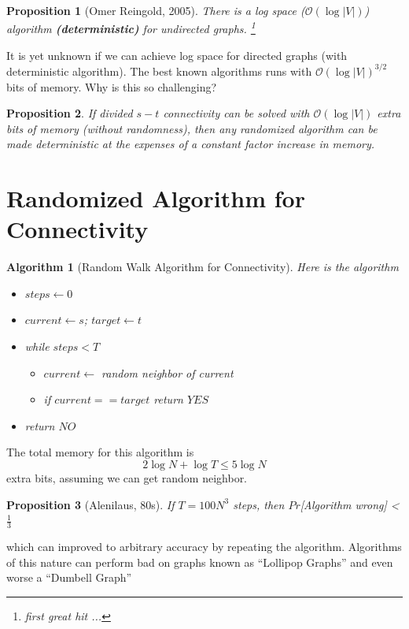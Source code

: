 \documentclass[11pt, letter]{book}
\newtheorem{algorithm}{Algorithm}[chapter]
\newtheorem{proposition}{Proposition}[chapter]
\begin{document}
\begin{proposition}[Omer Reingold, 2005]
	There is a log space ($\mathcal O ( \log | V | )$) algorithm \textbf{(deterministic)} for undirected graphs. \footnote{first great hit ...}
\end{proposition}

It is yet unknown if we can achieve log space for directed graphs (with deterministic algorithm). The best known algorithms runs with $\mathcal O (\log |V| ) ^{3/2}$ bits of memory. Why is this so challenging? 

\begin{proposition}
	If divided $s-t$ connectivity can be solved with $\mathcal O (\log |V| )$ extra bits of memory (without randomness), then any randomized algorithm can be made deterministic at the expenses of a constant factor increase in memory. 
\end{proposition}

\section{Randomized Algorithm for Connectivity}
\begin{algorithm}[Random Walk Algorithm for Connectivity] Here is the algorithm
	\begin{itemize}
		\item $steps \gets 0 $ 
		\item $current \gets s$; $target \gets t$
		\item while $steps < T$
		\begin{itemize}
			\item $current \gets $ random neighbor of current
			\item if $current == target$ return $YES$
		\end{itemize}
		\item return $NO$
	\end{itemize}
\end{algorithm}
The total memory for this algorithm is 
\begin{equation}
	2 \log N + \log T \leq 5 \log N
\end{equation}
extra bits, assuming we can get random neighbor. 

\begin{proposition}[Alenilaus, 80s]
	If $T = 100N^3$ steps, then $Pr$[Algorithm wrong] < $\frac{1}{3}$
\end{proposition}
which can improved to arbitrary accuracy by repeating the algorithm. Algorithms of this nature can perform bad on graphs known as ``Lollipop Graphs'' and even worse a ``Dumbell Graph''
\end{document}
